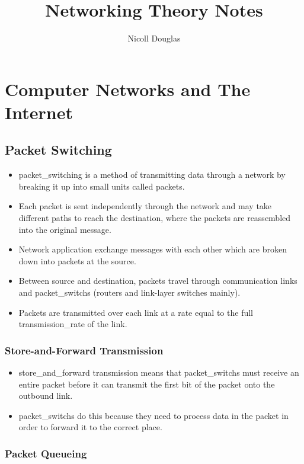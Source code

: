 \documentclass{article}
\title{Networking Theory Notes}
\author{Nicoll Douglas}
\begin{document}
\maketitle
\tableofcontents

\section{Computer Networks and The Internet}

\subsection{Packet Switching}

\begin{itemize}
    \item \Gls{packet_switching} is a method of transmitting data through a network by breaking it up into small units called packets.
    \item Each packet is sent independently through the network and may take different paths to reach the destination, where the packets are reassembled into the original message.
    \item Network application exchange messages with each other which are broken down into packets at the source.
    \item Between source and destination, packets travel through communication links and \glspl{packet_switch} (routers and link-layer switches mainly).
    \item Packets are transmitted over each link at a rate equal to the full \gls{transmission_rate} of the link.
\end{itemize}

\subsubsection{Store-and-Forward Transmission}

\begin{itemize}
    \item \Gls{store_and_forward} transmission means that \glspl*{packet_switch} must receive an entire packet before it can transmit the first bit of the packet onto the outbound link.
    \item \Glspl*{packet_switch} do this because they need to process data in the packet in order to forward it to the correct place.
\end{itemize}

\subsubsection{Packet Queueing}
\end{document}

